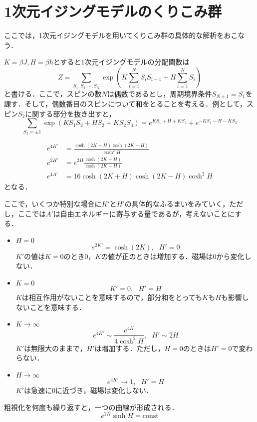 \documentclass[a4paper,11pt]{jsarticle}
\begin{document}
\section{1次元イジングモデルのくりこみ群}
ここでは，1次元イジングモデルを用いてくりこみ群の具体的な解析をおこなう．\par
$K=\beta J,H=\beta h$とすると1次元イジングモデルの分配関数は
\begin{equation*}
  Z = \sum_{S_1, S_2, \cdots , S_N} \exp \left( K\sum_{i=1}^{N}S_i S_{i+1} + H \sum_{i=1}^{N}S_i \right)
\end{equation*}
と書ける．ここで，スピンの数$N$は偶数であるとし，周期境界条件$S_{N+1}=S_1$を課す．そして，偶数番目のスピンについて和をとることを考える．例として，スピン$S_2$に関する部分を抜き出すと，
\begin{equation*}
  \sum_{S_2=\pm 1} \exp (K S_1 S_2 + H S_2 + K S_2 S_3) = e^{K S_1 + H + K S_3} + e^{-K S_1 - H - K S_3}
\end{equation*}

\begin{align*}
  e^{4K'} &= \frac{\cosh(2K+H)\cosh(2K-H)}{\cosh ^2H} \\
  e^{2H'} &= e^{2H} \frac{\cosh(2K+H)}{\cosh(2K-H)} \\
  e^{4A'} &= 16\cosh(2K+H)\cosh(2K-H)\cosh ^2H
\end{align*}
となる．\par
ここで，いくつか特別な場合に$K'$と$H'$の具体的なふるまいをみていく，ただし，ここでは$A'$は自由エネルギーに寄与する量であるが，考えないことにする．
\begin{itemize}
  \item $H=0$
  \begin{equation*}
    e^{2K'} = \cosh(2K),  \ \ \  H'=0
  \end{equation*}
  $K'$の値は$K=0$のとき$0$，$K$の値が正のときは増加する．磁場は$0$から変化しない．
  \item $K=0$
  \begin{equation*}
    K' = 0,  \ \ \  H' = H
  \end{equation*}
  $K$は相互作用がないことを意味するので，部分和をとっても$K$も$H$も影響しないことを意味する．
  \item $K \rightarrow \infty$
  \begin{equation*}
    e^{4K'} \sim \frac{e^{4K}}{4\cosh^2 H}, \ \ \ H' \sim 2H
  \end{equation*}
  $K'$は無限大のままで，$H'$は増加する．ただし，$H=0$のときは$H'=0$で変わらない．
  \item $H \rightarrow \infty$
  \begin{equation*}
    e^{4K'} \rightarrow 1 , \ \ \ H'=H
  \end{equation*}
  $K'$は急速に$0$に近づき，磁場は変化しない．
\end{itemize}
粗視化を何度も繰り返すと，一つの曲線が形成される．
\begin{equation*}
  e^{2K} \sinh H = \text{const} 
\end{equation*}
\end{document}
